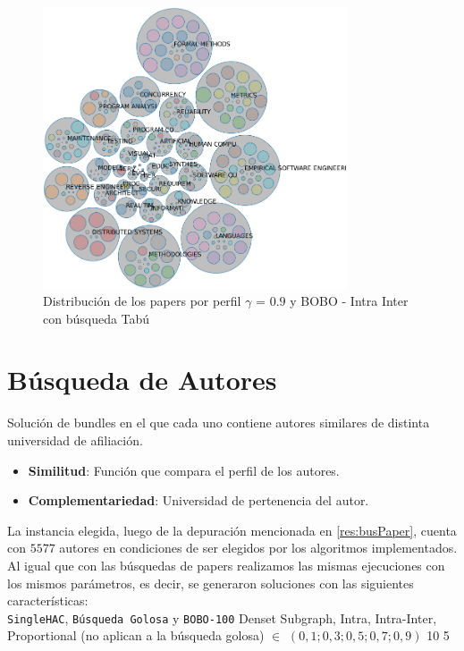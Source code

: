 \begin{figure}[H]
  \centering
    \includegraphics[width=0.8\textwidth]{resultados/papers/BOBO/INTRA_INTER/bubbles-gamma-with-local-09.png}
  \caption{Distribución de los papers por perfil $\gamma$ = $0.9$ y BOBO - Intra Inter con búsqueda Tabú}
  \label{res:img-papers-bubbles-gamma09-hac-intra-inter-bobo}
\end{figure}
\newpage
\section{Búsqueda de Autores}
Solución de bundles en el que cada uno contiene autores similares de distinta universidad de afiliación.\\
\begin{itemize}
  \item \textbf{Similitud}: Función que compara el perfil de los autores.
  \item \textbf{Complementariedad}: Universidad de pertenencia del autor.
\end{itemize}

La instancia elegida, luego de la depuración mencionada en \ref{res:busPaper}, cuenta con $5577$ autores en condiciones de ser elegidos por los algoritmos implementados.\\
Al igual que con las búsquedas de papers realizamos las mismas ejecuciones con los mismos parámetros, es decir, se generaron soluciones con las siguientes características:\\
\Solucion
{}
{\texttt{SingleHAC}, \texttt{Búsqueda Golosa} y \texttt{BOBO-100}}
{Denset Subgraph, Intra, Intra-Inter, Proportional (no aplican a la búsqueda golosa)}
{$\in$ $(0,1; 0,3; 0,5; 0,7; 0,9)$}
{10}
{5}

